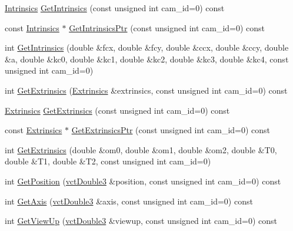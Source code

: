 \begin{DoxyCompactItemize}
\item 
\hyperlink{classsvl_camera_geometry_a864f6359614466009baca0666e6bc08e}{Intrinsics} \hyperlink{classsvl_camera_geometry_a9049f85393185b342b39a0aba9ec14de}{Get\-Intrinsics} (const unsigned int cam\-\_\-id=0) const 
\item 
const \hyperlink{classsvl_camera_geometry_a864f6359614466009baca0666e6bc08e}{Intrinsics} $\ast$ \hyperlink{classsvl_camera_geometry_a7b7772459fd731c625f64a343023d818}{Get\-Intrinsics\-Ptr} (const unsigned int cam\-\_\-id=0) const 
\item 
int \hyperlink{classsvl_camera_geometry_ac2deb86c967aeb2797e328ef7d3b42c4}{Get\-Intrinsics} (double \&fcx, double \&fcy, double \&ccx, double \&ccy, double \&a, double \&kc0, double \&kc1, double \&kc2, double \&kc3, double \&kc4, const unsigned int cam\-\_\-id=0)
\item 
int \hyperlink{classsvl_camera_geometry_a5627c4fbfee0d2c391ba54ef444409a6}{Get\-Extrinsics} (\hyperlink{classsvl_camera_geometry_a6954baa4bd0cc3577af09e13b1c18545}{Extrinsics} \&extrinsics, const unsigned int cam\-\_\-id=0) const 
\item 
\hyperlink{classsvl_camera_geometry_a6954baa4bd0cc3577af09e13b1c18545}{Extrinsics} \hyperlink{classsvl_camera_geometry_ae0177217a0452897bc6bb6d0cc718525}{Get\-Extrinsics} (const unsigned int cam\-\_\-id=0) const 
\item 
const \hyperlink{classsvl_camera_geometry_a6954baa4bd0cc3577af09e13b1c18545}{Extrinsics} $\ast$ \hyperlink{classsvl_camera_geometry_a772432f0f411391070012c2b9361e115}{Get\-Extrinsics\-Ptr} (const unsigned int cam\-\_\-id=0) const 
\item 
int \hyperlink{classsvl_camera_geometry_a5af0599de7a1c812d20a6bce812995f4}{Get\-Extrinsics} (double \&om0, double \&om1, double \&om2, double \&T0, double \&T1, double \&T2, const unsigned int cam\-\_\-id=0)
\item 
int \hyperlink{classsvl_camera_geometry_a0c5216ce427da9f4cb0c1bec17507d8d}{Get\-Position} (\hyperlink{vct_fixed_size_vector_types_8h_a4a89122c9d7f72c3f31fe8126e17c3af}{vct\-Double3} \&position, const unsigned int cam\-\_\-id=0) const 
\item 
int \hyperlink{classsvl_camera_geometry_aee4f24c1842818b52709445e42b26aa2}{Get\-Axis} (\hyperlink{vct_fixed_size_vector_types_8h_a4a89122c9d7f72c3f31fe8126e17c3af}{vct\-Double3} \&axis, const unsigned int cam\-\_\-id=0) const 
\item 
int \hyperlink{classsvl_camera_geometry_a65a6b7d0566605ccd3430c7bdcff5155}{Get\-View\-Up} (\hyperlink{vct_fixed_size_vector_types_8h_a4a89122c9d7f72c3f31fe8126e17c3af}{vct\-Double3} \&viewup, const unsigned int cam\-\_\-id=0) const 

\end{DoxyCompactItemize}

